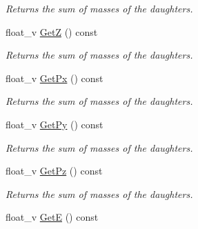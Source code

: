 \begin{DoxyCompactItemize}
\begin{DoxyCompactList}\small\item\em Returns the sum of masses of the daughters. \end{DoxyCompactList}\item 
float\+\_\+v \hyperlink{classKFParticleBaseSIMD_a3c6b3dbb664b880c348ac6fb0f715e85}{GetZ} () const \hypertarget{classKFParticleBaseSIMD_a3c6b3dbb664b880c348ac6fb0f715e85}{}\label{classKFParticleBaseSIMD_a3c6b3dbb664b880c348ac6fb0f715e85}

\begin{DoxyCompactList}\small\item\em Returns the sum of masses of the daughters. \end{DoxyCompactList}\item 
float\+\_\+v \hyperlink{classKFParticleBaseSIMD_adf7d8c12dcfa4f8696d83326847f4b48}{Get\+Px} () const \hypertarget{classKFParticleBaseSIMD_adf7d8c12dcfa4f8696d83326847f4b48}{}\label{classKFParticleBaseSIMD_adf7d8c12dcfa4f8696d83326847f4b48}

\begin{DoxyCompactList}\small\item\em Returns the sum of masses of the daughters. \end{DoxyCompactList}\item 
float\+\_\+v \hyperlink{classKFParticleBaseSIMD_aabb7573a7dd045b4b9c2762e5a626159}{Get\+Py} () const \hypertarget{classKFParticleBaseSIMD_aabb7573a7dd045b4b9c2762e5a626159}{}\label{classKFParticleBaseSIMD_aabb7573a7dd045b4b9c2762e5a626159}

\begin{DoxyCompactList}\small\item\em Returns the sum of masses of the daughters. \end{DoxyCompactList}\item 
float\+\_\+v \hyperlink{classKFParticleBaseSIMD_a829cb413174d40b78bf34f14fd536619}{Get\+Pz} () const \hypertarget{classKFParticleBaseSIMD_a829cb413174d40b78bf34f14fd536619}{}\label{classKFParticleBaseSIMD_a829cb413174d40b78bf34f14fd536619}

\begin{DoxyCompactList}\small\item\em Returns the sum of masses of the daughters. \end{DoxyCompactList}\item 
float\+\_\+v \hyperlink{classKFParticleBaseSIMD_aa15f73c7c6691e04911d32cb9b16ef9b}{GetE} () const \hypertarget{classKFParticleBaseSIMD_aa15f73c7c6691e04911d32cb9b16ef9b}{}\label{classKFParticleBaseSIMD_aa15f73c7c6691e04911d32cb9b16ef9b}


\end{DoxyCompactItemize}
